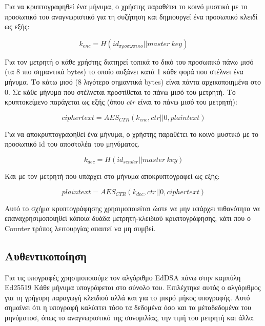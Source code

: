 Για να κρυπτογραφηθεί ένα μήνυμα, ο χρήστης παραθέτει το κοινό μυστικό με το προσωπικό του αναγνωριστικό για τη συζήτηση και δημιουργεί ένα προσωπικό κλειδί ως εξής:

\[
k_{enc} = H(id_{προσωπικο} || master\ key)
\]

Για τον μετρητή ο κάθε χρήστης διατηρεί τοπικά το δικό του προσωπικό πάνω μισό (τα 8 πιο σημαντικά bytes) το οποίο αυξάνει κατά 1 κάθε φορά που στέλνει ένα μήνυμα.
Το κάτω μισό (8 λιγότερο σημαντικά bytes) είναι πάντα αρχικοποιημένα στο 0.
Σε κάθε μήνυμα που στέλνεται προστίθεται το πάνω μισό του μετρητή.
Το κρυπτοκείμενο παράγεται ως εξής (όπου $ctr$ είναι το πάνω μισό του μετρητή):

\[
ciphertext = AES_{CTR}(k_{enc}, ctr||0, plaintext)
\]

Για να αποκρυπτογραφηθεί ένα μήνυμα, ο χρήστης παραθέτει το κοινό μυστικό με το προσωπικό id του αποστολέα του μηνύματος.

\[
k_{dec} = H(id_{sender} || master\ key)
\]

Και με τον μετρητή που υπάρχει στο μήνυμα αποκρυπτογραφεί ως εξής:

\[
plaintext = AES_{CTR}(k_{dec}, ctr||0, ciphertext)
\]

Αυτό το σχήμα κρυπτογράφησης χρησιμοποιείται ώστε να μην υπάρχει πιθανότητα να επαναχρησιμοποιηθεί κάποια δυάδα μετρητή-κλειδιού κρυπτογράφησης, κάτι που ο Counter τρόπος λειτουργίας απαιτεί να μη συμβεί.

\subsection{Αυθεντικοποίηση}

Για τις υπογραφές χρησιμοποιούμε τον αλγόριθμο EdDSA πάνω στην καμπύλη Ed25519
Κάθε μήνυμα υπογράφεται στο σύνολο του.
Επιλέχτηκε αυτός ο αλγόριθμος για τη γρήγορη παραγωγή κλειδιού αλλά και για το μικρό μήκος υπογραφής.
Αυτό σημαίνει ότι η υπογραφή καλύπτει τόσο τα δεδομένα όσο και τα μέταδεδομένα του μηνύματοσ, όπως το αναγνωριστικό της συνομιλίας, την τιμή του μετρητή και άλλα.

